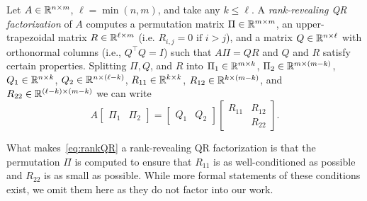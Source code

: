 \begin{definition}
Let $A \in \mathbb{R}^{n \times m}$, $\ell = \min(n,m)$, and take any $k \leq \ell$.
A \emph{rank-revealing QR factorization} of $A$ computes a permutation matrix $\Pi \in \mathbb{R}^{m \times m}$, an upper-trapezoidal matrix $R \in \mathbb{R}^{\ell \times m}$ (i.e. $R_{i,j}=0 \text{ if } i > j$), and a matrix $Q \in \mathbb{R}^{n \times \ell}$ with orthonormal columns (i.e., $Q^\top Q = I$) such that $A \Pi = Q R$ and $Q$ and $R$ satisfy certain properties.
Splitting $\Pi, Q$, and $R$ into $\Pi_1 \in \mathbb{R}^{m \times k}$, $\Pi_2 \in \mathbb{R}^{m \times (m-k)}$, $Q_1 \in \mathbb{R}^{n \times k}$, $Q_2 \in \mathbb{R}^{n \times (\ell-k)}$, $R_{11} \in \mathbb{R}^{k \times k}$, 
$R_{12} \in \mathbb{R}^{k \times (m-k)}$, and $R_{22} \in \mathbb{R}^{(\ell-k)\times(m-k)}$ we can write
\begin{equation}
\label{eq:rankQR}
    A
    \begin{bmatrix}
    \Pi_1 & \Pi_2
    \end{bmatrix}
    =
    \begin{bmatrix}
    Q_1 & Q_2
    \end{bmatrix}
    \begin{bmatrix}
    R_{11} & R_{12} \\
    & R_{22}
    \end{bmatrix}.
\end{equation}
\end{definition}

\begin{remarks}
What makes~\eqref{eq:rankQR} a rank-revealing QR factorization is that the permutation $\Pi$ is computed to ensure that $R_{11}$ is as well-conditioned as possible and $R_{22}$ is as small as possible. While more formal statements of these conditions exist, we omit them here as they do not factor into our work.
\end{remarks}

